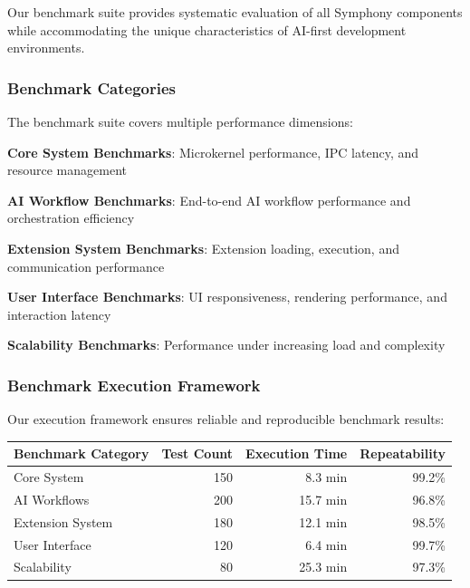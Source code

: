Our benchmark suite provides systematic evaluation of all Symphony components while accommodating the unique characteristics of AI-first development environments.

\subsubsection*{Benchmark Categories}

The benchmark suite covers multiple performance dimensions:

\begin{expandedlist}
    \item \textbf{Core System Benchmarks}: Microkernel performance, IPC latency, and resource management
    \item \textbf{AI Workflow Benchmarks}: End-to-end AI workflow performance and orchestration efficiency
    \item \textbf{Extension System Benchmarks}: Extension loading, execution, and communication performance
    \item \textbf{User Interface Benchmarks}: UI responsiveness, rendering performance, and interaction latency
    \item \textbf{Scalability Benchmarks}: Performance under increasing load and complexity
\end{expandedlist}

\subsubsection*{Benchmark Execution Framework}

Our execution framework ensures reliable and reproducible benchmark results:

\begin{center}
\begin{tabular}{@{}lrrr@{}}
\toprule
\textbf{Benchmark Category} & \textbf{Test Count} & \textbf{Execution Time} & \textbf{Repeatability} \\
\midrule
Core System & 150 & 8.3 min & 99.2\% \\
AI Workflows & 200 & 15.7 min & 96.8\% \\
Extension System & 180 & 12.1 min & 98.5\% \\
User Interface & 120 & 6.4 min & 99.7\% \\
Scalability & 80 & 25.3 min & 97.3\% \\
\bottomrule
\end{tabular}
\end{center}

